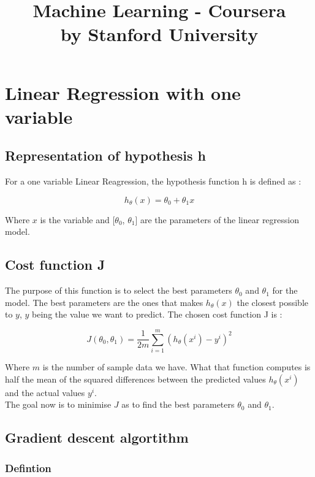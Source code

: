 \documentclass{article}
\begin{document}
\title{Machine Learning - Coursera\\
\large by Stanford University}

\maketitle
\newpage
\section{Linear Regression with one variable}

\subsection{Representation of hypothesis h}
 
 For a one variable Linear Reagression, the hypothesis function h is defined as : 
\begin{center}
	 $$h_\theta(x) = \theta_0 + \theta_1x$$
\end{center}

Where $x$ is the variable and [$\theta_0$, $\theta_1$] are the parameters of the linear regression model.

\subsection{Cost function J}
The purpose of this function is to select the best parameters $\theta_0$ and $\theta_1$ for the model. The best parameters are the ones that makes $h_\theta(x)$ the closest possible to $y$, $y$ being the value we want to predict.
The chosen cost function J is :
\begin{center}
	$$J(\theta_0, \theta_1) = \frac{1}{2m}\sum_{i = 1}^{m}(h_\theta(x^i) - y^i)^2$$
\end{center}
Where $m$ is the number of sample data we have. What that function computes is half the mean of the squared differences between the predicted values $h_\theta(x^i)$ and the actual values $y^i$.\\
The goal now is to minimise $J$ as to find the best parameters $\theta_0$ and $\theta_1$.

\subsection{Gradient descent algortithm}
\subsubsection{Defintion}
\end{document}

